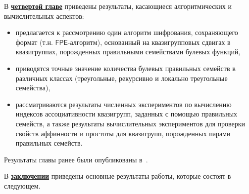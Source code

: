     В \underline{\textbf{четвертой главе}} приведены результаты, касающиеся алгоритмических и вычислительных аспектов:
    \begin{itemize}
        \item предлагается к рассмотрению один алгоритм шифрования, сохраняющего формат (т.н. $\mathsf{FPE}$-алгоритм), основанный на квазигрупповых сдвигах в квазигруппах, порожденных правильными семействами булевых функций,  
        \item приводятся точные значение количества булевых правильных семейств в различных классах (треугольные, рекурсивно и локально треугольные семейства),
        \item рассматриваются результаты численных экспериментов по вычислению индексов ассоциативности квазигрупп, заданных с помощью правильных семейств, а также результаты вычислительных экспериментов для проверки свойств аффинности и простоты для квазигрупп, порожденных парами правильных семейств.
    \end{itemize}
    Результаты главы ранее были опубликованы в~\cite{fpe22, tsar24, sibecrypt23}.

\FloatBarrier
    В \underline{\textbf{заключении}} приведены основные результаты работы, которые состоят в следующем.
    


